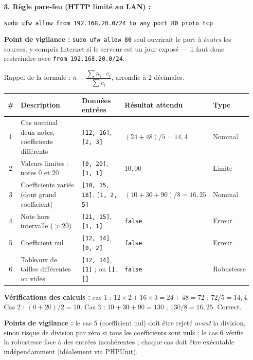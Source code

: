 \documentclass[11pt]{article}
\begin{document}
\begin{corrige}
\textbf{3. Règle pare-feu (HTTP limité au LAN) :}
\begin{lstlisting}
sudo ufw allow from 192.168.20.0/24 to any port 80 proto tcp
\end{lstlisting}
\textbf{Point de vigilance :} \texttt{sudo ufw allow 80} seul ouvrirait le port à \emph{toutes} les sources, y compris Internet si le serveur est un jour exposé --- il faut donc restreindre avec \texttt{from 192.168.20.0/24}.
\end{corrige}

\begin{corrige}
Rappel de la formule : $\bar{n} = \dfrac{\sum n_i \cdot c_i}{\sum c_i}$, arrondie à 2 décimales.

\begin{center}
\begin{tabularx}{\linewidth}{|c|X|X|X|l|}\hline
\rowcolor{popblueL} \textbf{\#} & \textbf{Description} & \textbf{Données entrées} & \textbf{Résultat attendu} & \textbf{Type} \\\hline
1 & Cas nominal : deux notes, coefficients différents & \texttt{[12, 16]}, \texttt{[2, 3]} & $(24+48)/5 = 14{,}4$ & Nominal \\\hline
2 & Valeurs limites : notes 0 et 20 & \texttt{[0, 20]}, \texttt{[1, 1]} & $10{,}00$ & Limite \\\hline
3 & Coefficients variés (dont grand coefficient) & \texttt{[10, 15, 18]}, \texttt{[1, 2, 5]} & $(10+30+90)/8 = 16{,}25$ & Nominal \\\hline
4 & Note hors intervalle ($> 20$) & \texttt{[21, 15]}, \texttt{[1, 1]} & \texttt{false} & Erreur \\\hline
5 & Coefficient nul & \texttt{[12, 14]}, \texttt{[0, 2]} & \texttt{false} & Erreur \\\hline
6 & Tableaux de tailles différentes ou vides & \texttt{[12, 14]}, \texttt{[1]} ; ou \texttt{[]}, \texttt{[]} & \texttt{false} & Robustesse \\\hline
\end{tabularx}
\end{center}

\textbf{Vérifications des calculs :} cas 1 : $12\times2+16\times3 = 24+48 = 72$ ; $72/5 = 14{,}4$. Cas 2 : $(0+20)/2 = 10$. Cas 3 : $10+30+90 = 130$ ; $130/8 = 16{,}25$. Correct.

\textbf{Points de vigilance :} le cas 5 (coefficient nul) doit être rejeté \emph{avant} la division, sinon risque de division par zéro si tous les coefficients sont nuls ; le cas 6 vérifie la robustesse face à des entrées incohérentes ; chaque cas doit être exécutable indépendamment (idéalement via PHPUnit).
\end{corrige}
\end{document}
